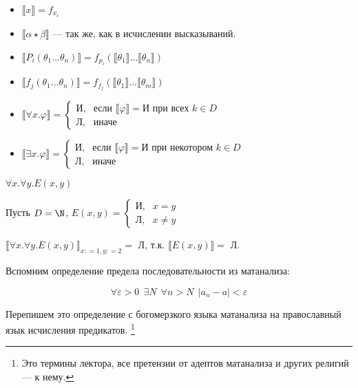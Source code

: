 \begin{itemize}
    \item \(\llbracket x \rrbracket = f_{x_i}\)
    \item \(\llbracket \alpha \star \beta \rrbracket\) --- так же, как в исчислении высказываний.
    \item \(\llbracket P_i(\theta_1 \dots \theta_n) \rrbracket = f_{p_i}(\llbracket \theta_1 \rrbracket \dots \llbracket \theta_n \rrbracket)\)
    \item \(\llbracket f_j(\theta_1 \dots \theta_n) \rrbracket = f_{f_j}(\llbracket \theta_1 \rrbracket \dots \llbracket \theta_m \rrbracket)\)
    \item \(\llbracket \forall x.\varphi \rrbracket = \begin{cases} \text{И}, & \text{если } \llbracket \varphi \rrbracket = \text{И} \text{ при всех } k\in D \\
              \text{Л}, & \text{иначе}
          \end{cases} \)
    \item \(\llbracket \exists x.\varphi \rrbracket = \begin{cases} \text{И}, & \text{если } \llbracket \varphi \rrbracket = \text{И} \text{ при некотором } k\in D \\
              \text{Л}, & \text{иначе}
          \end{cases} \)
\end{itemize}

\begin{example}
    \(\forall x.\forall y.E(x, y)\)

    Пусть \(D = \N\), \(E(x, y) = \begin{cases} \text{И}, & x = y \\ \text{Л}, & x \neq y \end{cases} \)

    \(\llbracket\forall x.\forall y.E(x, y)\rrbracket_{x: = 1, y: = 2} =\) Л, т.к. \(\llbracket E(x, y) \rrbracket =\) Л.
\end{example}

Вспомним определение предела последовательности из матанализа:

\[\forall \varepsilon > 0 \ \ \exists N \ \ \forall n > N \ \ |a_n - a| < \varepsilon\]

Перепишем это определение с богомерзкого языка матанализа на православный язык исчисления предикатов. \footnote{Это термины лектора, все претензии от адептов матанализа и других религий --- к нему.}

